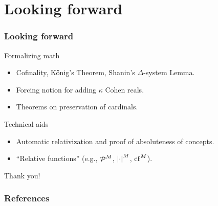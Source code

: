\documentclass[english]{beamer}
\begin{document}

\section{Looking forward}

\begin{frame}
  \frametitle{Looking forward}
  \begin{block}{Formalizing math}
    \begin{itemize}
    \item Cofinality, K\H{o}nig's Theorem, Shanin's $\Delta$-system Lemma.
    \item Forcing notion for adding $\kappa$ Cohen reals.
    \item Theorems on preservation of cardinals.
    \end{itemize}
  \end{block}
  \pause
  \begin{block}{Technical aids}
    \begin{itemize}
    \item Automatic relativization and proof of absoluteness of concepts.
    \item ``Relative functions'' (e.g., $\P^M$, $\card{\cdot}^M$, $\cf^M$).
    \end{itemize}
  \end{block}
\end{frame}

\begin{frame}
  \begin{shadowblock}{}
    \begin{center}
      {\Huge Thank you!}
    \end{center}
  \end{shadowblock}
\end{frame}

\begin{frame}
  \frametitle{References}
  
  
\end{frame}
\end{document}
